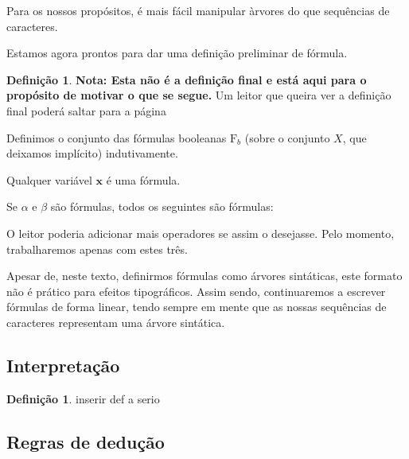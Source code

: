 \documentclass{report}
\theoremstyle{definition}
\newtheorem{definicao}{Definição}
\newtheorem*{definicao*}{Definição}
\theoremstyle{remark}
\renewcommand{\bf}[1]{\mathbf{#1}}
\newcommand{\F}{\mathrm{F}}
\begin{document}
	Para os nossos propósitos, é mais fácil manipular àrvores do que sequências de caracteres.
	
	Estamos agora prontos para dar uma definição preliminar de fórmula.
	
	\begin{definicao*}
	\textbf{Nota: Esta não é a definição final e está aqui para o propósito de motivar o que se segue.} Um leitor que queira ver a definição final poderá saltar para a página \pageref{def:formulaproposicional}
	
	Definimos o conjunto das fórmulas booleanas $\F_b$ (sobre o conjunto $X$, que deixamos implícito) indutivamente.
	
	Qualquer variável $\bf x$ é uma fórmula.
	
	Se $\alpha$ e $\beta$ são fórmulas, todos os seguintes são fórmulas:
	
	\begin{center}
	\hspace{3em}
	\hspace{3em}
	\hspace{3em}
	\scalebox{2}{$\dots$}
	\end{center}
	\end{definicao*}
	
	O leitor poderia adicionar mais operadores se assim o desejasse. Pelo momento, trabalharemos apenas com estes três.
	
	Apesar de, neste texto, definirmos fórmulas como árvores sintáticas, este formato não é prático para efeitos tipográficos. Assim sendo, continuaremos a escrever fórmulas de forma linear, tendo sempre em mente que as nossas sequências de caracteres representam uma árvore sintática.
	
	\subsection{Interpretação}
	
	\pagebreak
	
	\begin{definicao}\label{def:formulaproposicional}
	inserir def a serio
	\end{definicao}
	
	\subsection{Regras de dedução}
	
\end{document}
